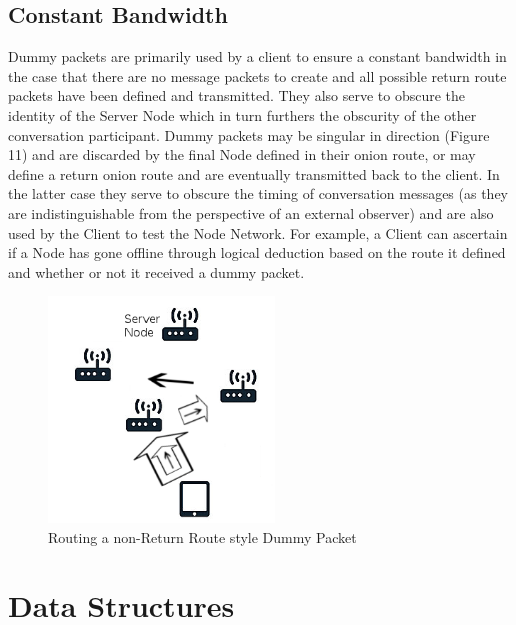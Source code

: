 \documentclass{article}
\begin{document}
\subsection{Constant Bandwidth}
Dummy packets are primarily used by a client to ensure a constant bandwidth in the case that there are no message packets to create and all possible return route
packets have been defined and transmitted. They also serve to obscure the identity of the Server Node which in turn furthers the obscurity of the other conversation participant.
Dummy packets may be singular in direction (Figure 11) and are discarded by the final Node defined in their onion route, or may define a return onion route and are
eventually transmitted back to the client. In the latter case they serve to obscure the timing of conversation messages (as they are indistinguishable from the perspective
of an external observer) and are also used by the Client to test the Node Network. For example, a Client can ascertain if a Node has gone offline through logical deduction
based on the route it defined and whether or not it received a dummy packet.
\begin{figure}[h]
	\centering
  	\includegraphics[width=6cm,height=6cm,keepaspectratio]{img/DummyPacket.png}
	\caption{Routing a non-Return Route style Dummy Packet}
\end{figure}

\newpage

\section{Data Structures}
\end{document}
